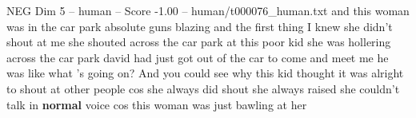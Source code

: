 \begin{textsample}{NEG Dim 5 – human – Score -1.00 – human/t000076\_human.txt}  \label{ex:f5_neg_038}
and this woman was in the car park absolute guns blazing and the first thing I knew she didn't shout at me she shouted across the car park at this poor kid she was hollering across the car park david had just got out of the car to come and meet me he was like what 's going on?
And you could see why this kid thought it was alright to shout at other people cos she always did shout she always raised she couldn't talk in \textbf{normal} voice cos this woman was just bawling at her

\end{textsample}
